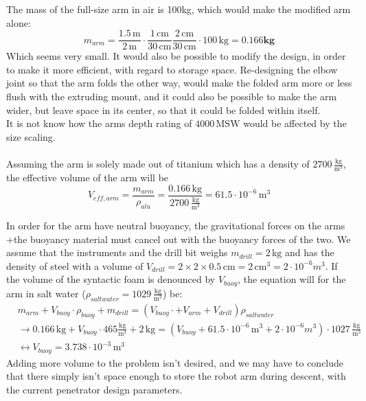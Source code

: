 The mass of the full-size arm in air is 100kg, which would make the modified arm alone:
\begin{equation}
m_{arm}=\frac{1.5\,\mathrm{m}}{2\,\mathrm{m}}\cdot\frac{1\,\mathrm{cm}}{30\,\mathrm{cm}}\frac{2\,\mathrm{cm}}{30\,\mathrm{cm}}\cdot 100\,\mathrm{kg}=\mathbf{0.166kg}
\end{equation}
Which seems very small. It would also be possible to modify the design, in order to make it more efficient, with regard to storage space. Re-designing the elbow joint so that the arm folds the other way, would make the folded arm more or less flush with the extruding mount, and it could also be possible to make the arm wider, but leave space in its center, so that it could be folded within itself.\\
It is not know how the arms depth rating of $4000\,\mathrm{MSW}$ would be affected by the size scaling.\\
\\
Assuming the arm is solely made out of titanium which has a density of $2700\,\frac{\mathrm{kg}}{\mathrm{m^3}}$, the effective volume of the arm will be 
\begin{equation}
V_{eff,arm}=\frac{m_{arm}}{\rho_{alu}}=\frac{0.166\,\mathrm{kg}}{2700\,\mathrm{\frac{kg}{m^3}}}=61.5\cdot 10^{-6} \, \mathrm{m^3}
\end{equation}

In order for the arm have neutral buoyancy, the gravitational forces on the arms$+$the buoyancy material must cancel out with the buoyancy forces of the two. We assume that the instruments and the drill bit weighs $m_{drill}=2\,\mathrm{kg}$ and has the density of steel with a volume of $V_{drill}=2\times 2 \times 0.5 \, \mathrm{cm}=2\,\mathrm{cm^3}=2\cdot 10^{-6}m^3$. If the volume of the syntactic foam is denounced by $V_{buoy}$, the equation will for the arm in salt water ($\rho_{saltwater}=1029 \, \mathrm{\frac{kg}{m^3}}$) be:
\begin{equation}
\begin{split}
&m_{arm}+V_{buoy}\cdot \rho_{buoy} + m_{drill}=(V_{buoy}\cdot + V_{arm}+V_{drill})\rho_{saltwater}\\
&\rightarrow 0.166\,\mathrm{kg}+V_{buoy}\cdot 465 \mathrm{\frac{kg}{m^3}}+2\,\mathrm{kg}=(V_{buoy}+61.5\cdot 10^{-6}\,\mathrm{m^3}+2\cdot 10^{-6}m^3)\cdot 1027 \,\mathrm{\frac{kg}{m^3}}\\
& \leftrightarrow V_{buoy} = 3.738\cdot 10^{-3}\,\mathrm{m^3}
\end{split}
\end{equation}
Adding more volume to the problem isn't desired, and we may have to conclude that there simply isn't space enough to store the robot arm during descent, with the current penetrator design parameters.
\iffalse

